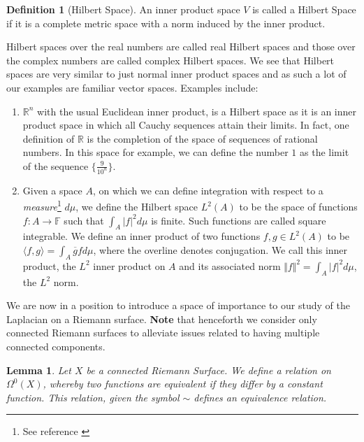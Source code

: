 \documentclass[11pt]{report}
\newtheorem{lemma}[thm]{Lemma}
\theoremstyle{definition}
\newtheorem{defn}[thm]{Definition}
\begin{document}
\begin{defn}[Hilbert Space]
  An inner product space $V$ is called a Hilbert Space if it is a complete metric space with a norm induced by the inner product.
\end{defn}
Hilbert spaces over the real numbers are called real Hilbert spaces and those over the complex numbers are called complex Hilbert spaces. We see that Hilbert spaces are very similar to just normal inner product spaces and as such a lot of our examples are familiar vector spaces. Examples include:
\begin{enumerate}
  \item $\mathbb{R}^n$ with the usual Euclidean inner product, is a Hilbert space as it is an inner product space in which all Cauchy sequences attain their limits. In fact, one definition of $\mathbb{R}$ is the completion of the space of sequences of rational numbers. In this space for example, we can define the number $1$ as the limit of the sequence $\{\frac{9}{10^n}\}$.
  \item Given a space $A$, on which we can define integration with respect to a \emph{measure}\footnote{See reference \cite[Chapter 11]{babyRudin}} $d\mu$, we define the Hilbert space $L^2(A)$ to be the space of functions $f: A \rightarrow \mathbb{F}$ such that $\int_A |f|^2 d\mu$ is finite. Such functions are called square integrable. We define an inner product of two functions $f,g \in L^2(A)$ to be $\langle f, g\rangle = \int_A \overline{g} f d\mu$, where the overline denotes conjugation. We call this inner product, the $L^2$ inner product on $A$ and its associated norm $\Vert f \Vert^2 = \int_A |f|^2 d\mu$, the $L^2$ norm.
\end{enumerate}

We are now in a position to introduce a space of importance to our study of the Laplacian on a Riemann surface. \textbf{Note} that henceforth we consider only connected Riemann surfaces to alleviate issues related to having multiple connected components.

\begin{lemma}
  Let $X$ be a connected Riemann Surface. We define a relation on $\Omega^0(X)$, whereby two functions are equivalent if they differ by a constant function. This relation, given the symbol $\sim$ defines an equivalence relation.
\end{lemma}
\end{document}
